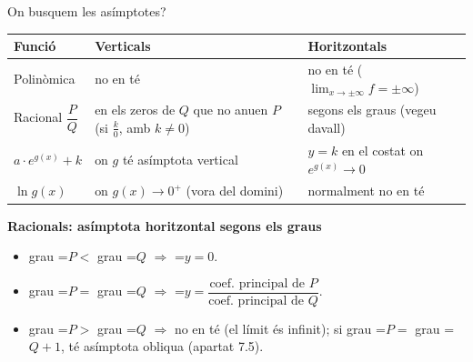 \documentclass[11pt,a4paper]{article}
\newcommand{\lt}{<}\newcommand{\gt}{>}
\newcommand{\fmm}[1]{\setbox0=\hbox{$#1$}\ifdim\wd0>\linewidth\[#1\]\else\mbox{\box0}\fi}
\newcommand{\fmuline}[1]{\textbf{\color{fmaccent}#1}}
\begin{document}
  
\begin{fmprop}{On busquem les asímptotes?}
\begin{center}\renewcommand{\arraystretch}{1.35}\small\begin{tabularx}{\linewidth}{>{\raggedright\arraybackslash}p{2.6cm}>{\raggedright\arraybackslash}X>{\raggedright\arraybackslash}p{4.7cm}}\toprule
\textbf{Funció} & \textbf{Verticals} & \textbf{Horitzontals}\\\midrule
Polinòmica & no en té & no en té ($\lim_{x\to\pm\infty}f=\pm\infty$)\\[3pt]
Racional $\dfrac{P}{Q}$ & en els zeros de $Q$ que no anu\lgem{}en $P$ (si $\frac{k}{0}$, amb $k\neq0$) & segons els graus (vegeu davall)\\[3pt]
$a\cdot e^{g(x)}+k$ & on $g$ té asímptota vertical & $y=k$ en el costat on $e^{g(x)}\to0$\\[3pt]
$\ln g(x)$ & on $g(x)\to0^+$ (vora del domini) & normalment no en té\\[3pt]
\bottomrule\end{tabularx}\end{center}

      

\fmuline{Racionals: asímptota horitzontal segons els graus}

      
\begin{itemize}
\item grau \fmm{P\lt} grau \fmm{Q} $\Rightarrow$ \fmm{y=0}.
\item grau \fmm{P=} grau \fmm{Q} $\Rightarrow$ \fmm{y=\dfrac{\text{coef. principal de }P}{\text{coef. principal de }Q}}.
\item grau \fmm{P\gt} grau \fmm{Q} $\Rightarrow$ no en té (el límit és infinit); si grau \fmm{P=} grau \fmm{Q+1}, té asímptota obliqua (apartat 7.5).
\end{itemize}
\end{fmprop}
\end{document}
